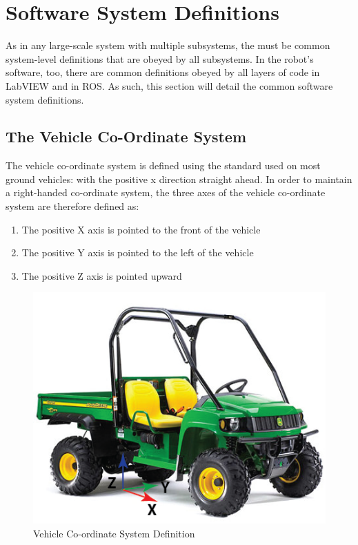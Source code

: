 \section{Software System Definitions}

As in any large-scale system with multiple subsystems, the must be common system-level definitions that are obeyed by all subsystems. In the robot's software, too, there are common definitions obeyed by all layers of code in LabVIEW and in ROS. As such, this section will detail the common software system definitions.

\subsection{The Vehicle Co-Ordinate System}

The vehicle co-ordinate system is defined using the standard used on most ground vehicles: with the positive x direction straight ahead. In order to maintain a right-handed co-ordinate system, the three axes of the vehicle co-ordinate system are therefore defined as:

\begin{enumerate}
\item The positive X axis is pointed to the front of the vehicle
\item The positive Y axis is pointed to the left of the vehicle
\item The positive Z axis is pointed upward
\end{enumerate}

\begin{figure}[h!]
\centering
\includegraphics[scale=.7]{Photos/veh_coord.png}
\caption{Vehicle Co-ordinate System Definition}
\label{fig:veh_coord}
\end{figure} 


